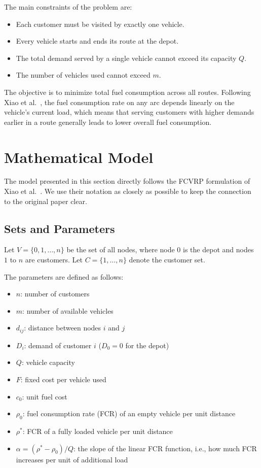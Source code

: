 \documentclass [a4paper, 11pt, titlepage] {article}
\begin{document}
The main constraints of the problem are:

\begin{itemize}
    \item Each customer must be visited by exactly one vehicle.
    \item Every vehicle starts and ends its route at the depot.
    \item The total demand served by a single vehicle cannot exceed its capacity $Q$.
    \item The number of vehicles used cannot exceed $m$.
\end{itemize}

The objective is to minimize total fuel consumption across all routes. Following Xiao et al.\ \cite{xiao2012}, the fuel consumption rate on any arc depends linearly on the vehicle's current load, which means that serving customers with higher demands earlier in a route generally leads to lower overall fuel consumption.

\section{Mathematical Model}
\label{sec:model}

The model presented in this section directly follows the FCVRP formulation of Xiao et al.\ \cite{xiao2012}. We use their notation as closely as possible to keep the connection to the original paper clear.

\subsection{Sets and Parameters}

Let $V = \{0, 1, \ldots, n\}$ be the set of all nodes, where node $0$ is the depot and nodes $1$ to $n$ are customers. Let $C = \{1, \ldots, n\}$ denote the customer set.

The parameters are defined as follows:

\begin{itemize}
    \item $n$: number of customers
    \item $m$: number of available vehicles
    \item $d_{ij}$: distance between nodes $i$ and $j$
    \item $D_i$: demand of customer $i$ ($D_0 = 0$ for the depot)
    \item $Q$: vehicle capacity
    \item $F$: fixed cost per vehicle used
    \item $c_0$: unit fuel cost
    \item $\rho_0$: fuel consumption rate (FCR) of an empty vehicle per unit distance
    \item $\rho^*$: FCR of a fully loaded vehicle per unit distance
    \item $\alpha = (\rho^* - \rho_0)/Q$: the slope of the linear FCR function, i.e., how much FCR increases per unit of additional load
\end{itemize}
\end{document}
